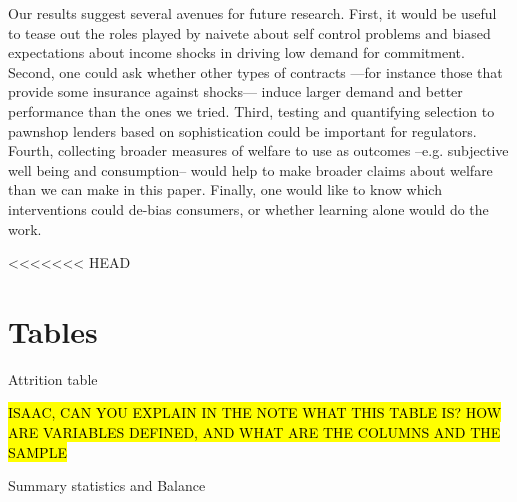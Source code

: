 \documentclass[oneside,11pt]{article}
\begin{document}
{Our results suggest several avenues for future research. First, it would be useful to tease out the roles played by naivete about self control problems and biased expectations about income shocks in driving low demand for commitment. Second, one could ask whether other types of contracts ---for instance those that provide some insurance against shocks---  induce larger demand and better performance than the ones we tried. Third, testing and quantifying selection to pawnshop lenders based on sophistication could be important for regulators. Fourth, collecting broader measures of welfare to use as outcomes --e.g. subjective well being and consumption-- would help to make broader claims about welfare than we can make in this paper. Finally, one would like to know which interventions could de-bias consumers, or whether learning alone would do the work.




<<<<<<< HEAD



\newpage


\clearpage

%
%






\newpage
\singlespacing

\section{Tables}

\begin{table}[H]
\caption{Attrition table}
\label{attrition_table}
\begin{center}
\scriptsize{}
\end{center}
 \scriptsize  

 \noindent \hl{ISAAC, CAN YOU EXPLAIN IN THE NOTE WHAT THIS TABLE IS? HOW ARE VARIABLES DEFINED, AND WHAT ARE THE COLUMNS AND THE SAMPLE }
\end{table}


\begin{table}[H]
\caption{Summary statistics and Balance}
\label{SS}
\begin{center}
\scriptsize{}
\end{center}
 \scriptsize


\end{table}}
\end{document}
